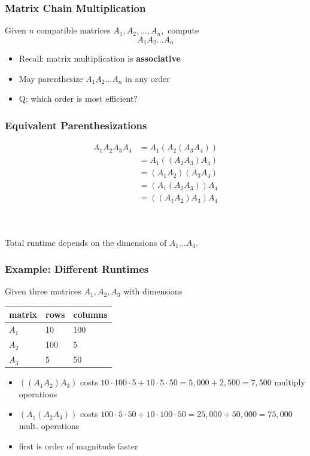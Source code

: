 \documentclass[10pt,aspectratio=169]{beamer}
\newcommand{\stanza}{ \\~\ }
\begin{document}
\begin{frame} \frametitle{Matrix Chain Multiplication}
  Given $n$ compatible matrices $A_1, A_2, \ldots, A_n,$ compute
  \[ A_1 A_2 \ldots A_n \]

  \begin{itemize}
    \item Recall: matrix multiplication is \textbf{associative}
    \item May parenthesize $ A_1 A_2 \ldots A_n $ in any order
    \item Q: which order is most efficient?
  \end{itemize}
\end{frame}

\begin{frame} \frametitle{Equivalent Parenthesizations}
 \begin{align*}
    A_1 A_2 A_3 A_4
    &= A_1 (A_2(A_3 A_4)) \\
    &= A_1 ((A_2 A_3) A_4) \\
    &= (A_1 A_2) (A_3 A_4) \\
    &= (A_1 (A_2 A_3)) A_4 \\
    &= ((A_1 A_2) A_3) A_4
  \end{align*}
\stanza

\begin{center}
  Total runtime depends on the dimensions of $A_1 \ldots A_4.$
\end{center}
\end{frame}

\begin{frame} \frametitle{Example: Different Runtimes}
Given three matrices $A_1, A_2, A_3$ with dimensions
\begin{center}
  \begin{tabular}{l|ll}
    matrix & rows & columns \\ \hline
    $A_1$ & 10 & 100 \\
    $A_2$ & 100 & 5 \\
    $A_3$ & 5 & 50
  \end{tabular}
\end{center}
\begin{itemize}
  \item $((A_1 A_2)A_3)$ costs $10 \cdot 100 \cdot 5 + 10 \cdot 5 \cdot 50= 5,000+2,500 = 7,500$ multiply operations
  \item $(A_1 (A_2 A_3))$ costs $100 \cdot 5 \cdot 50 + 10 \cdot 100 \cdot 50 = 25,000 + 50,000 = 75,000$ mult. operations
  \item first is order of magnitude faster
\end{itemize}
\end{frame}
\end{document}
